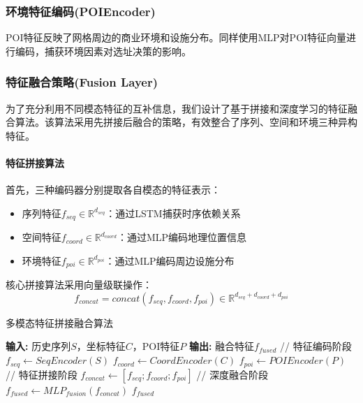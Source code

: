 \documentclass{article}
\begin{document}
\subsubsection{环境特征编码(POIEncoder)}
POI特征反映了网格周边的商业环境和设施分布。同样使用MLP对POI特征向量进行编码，捕获环境因素对选址决策的影响。

\subsubsection{特征融合策略(Fusion Layer)}
为了充分利用不同模态特征的互补信息，我们设计了基于拼接和深度学习的特征融合算法。该算法采用先拼接后融合的策略，有效整合了序列、空间和环境三种异构特征。

\paragraph{特征拼接算法}
首先，三种编码器分别提取各自模态的特征表示：
\begin{itemize}
    \item 序列特征$ f_{seq} \in \mathbb{R}^{d_{seq}} $：通过LSTM捕获时序依赖关系
    \item 空间特征$ f_{coord} \in \mathbb{R}^{d_{coord}} $：通过MLP编码地理位置信息  
    \item 环境特征$ f_{poi} \in \mathbb{R}^{d_{poi}} $：通过MLP编码周边设施分布
\end{itemize}

核心拼接算法采用向量级联操作：
\begin{equation}
f_{concat} = concat(f_{seq}, f_{coord}, f_{poi}) \in \mathbb{R}^{d_{seq} + d_{coord} + d_{poi}}
\end{equation}

\begin{algorithm}[H]
\caption{多模态特征拼接融合算法}
\begin{algorithmic}[1]
\State \textbf{输入:} 历史序列$S$，坐标特征$C$，POI特征$P$
\State \textbf{输出:} 融合特征$f_{fused}$
\State // 特征编码阶段
\State $f_{seq} \gets SeqEncoder(S)$ 
\State $f_{coord} \gets CoordEncoder(C)$ 
\State $f_{poi} \gets POIEncoder(P)$ 
\State // 特征拼接阶段
\State $f_{concat} \gets [f_{seq}; f_{coord}; f_{poi}]$ 
\State // 深度融合阶段
\State $f_{fused} \gets MLP_{fusion}(f_{concat})$ 
\State \Return $f_{fused}$
\end{algorithmic}
\end{algorithm}
\end{document}
